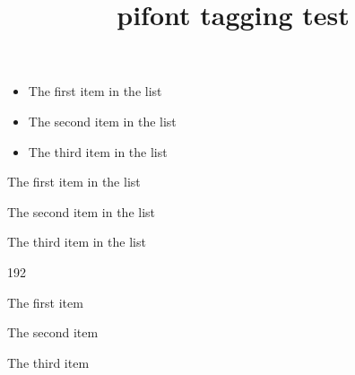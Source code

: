 \documentclass{article}
\title{pifont tagging test}
\begin{document}


\begin{itemize}
\item The first item in the list
\item The second item in the list
\item The third item in the list
\end{itemize}

\begin{dinglist}{43}
\item The first item in the list
\item The second item in the list
\item The third item in the list
\end{dinglist}

\begin{dingautolist}{192}
\item The first item
\item The second item
\item The third item
\end{dingautolist}


\end{document}
